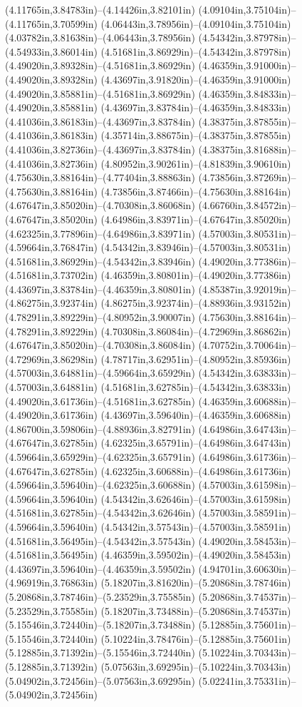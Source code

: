 (4.11765in,3.84783in)--(4.14426in,3.82101in) (4.09104in,3.75104in)--(4.11765in,3.70599in) (4.06443in,3.78956in)--(4.09104in,3.75104in) (4.03782in,3.81638in)--(4.06443in,3.78956in) (4.54342in,3.87978in)--(4.54933in,3.86014in) (4.51681in,3.86929in)--(4.54342in,3.87978in) (4.49020in,3.89328in)--(4.51681in,3.86929in) (4.46359in,3.91000in)--(4.49020in,3.89328in) (4.43697in,3.91820in)--(4.46359in,3.91000in) (4.49020in,3.85881in)--(4.51681in,3.86929in) (4.46359in,3.84833in)--(4.49020in,3.85881in) (4.43697in,3.83784in)--(4.46359in,3.84833in) (4.41036in,3.86183in)--(4.43697in,3.83784in) (4.38375in,3.87855in)--(4.41036in,3.86183in) (4.35714in,3.88675in)--(4.38375in,3.87855in) (4.41036in,3.82736in)--(4.43697in,3.83784in) (4.38375in,3.81688in)--(4.41036in,3.82736in) (4.80952in,3.90261in)--(4.81839in,3.90610in) (4.75630in,3.88164in)--(4.77404in,3.88863in) (4.73856in,3.87269in)--(4.75630in,3.88164in) (4.73856in,3.87466in)--(4.75630in,3.88164in) (4.67647in,3.85020in)--(4.70308in,3.86068in) (4.66760in,3.84572in)--(4.67647in,3.85020in) (4.64986in,3.83971in)--(4.67647in,3.85020in) (4.62325in,3.77896in)--(4.64986in,3.83971in) (4.57003in,3.80531in)--(4.59664in,3.76847in) (4.54342in,3.83946in)--(4.57003in,3.80531in) (4.51681in,3.86929in)--(4.54342in,3.83946in) (4.49020in,3.77386in)--(4.51681in,3.73702in) (4.46359in,3.80801in)--(4.49020in,3.77386in) (4.43697in,3.83784in)--(4.46359in,3.80801in) (4.85387in,3.92019in)--(4.86275in,3.92374in) (4.86275in,3.92374in)--(4.88936in,3.93152in) (4.78291in,3.89229in)--(4.80952in,3.90007in) (4.75630in,3.88164in)--(4.78291in,3.89229in) (4.70308in,3.86084in)--(4.72969in,3.86862in) (4.67647in,3.85020in)--(4.70308in,3.86084in) (4.70752in,3.70064in)--(4.72969in,3.86298in) (4.78717in,3.62951in)--(4.80952in,3.85936in) (4.57003in,3.64881in)--(4.59664in,3.65929in) (4.54342in,3.63833in)--(4.57003in,3.64881in) (4.51681in,3.62785in)--(4.54342in,3.63833in) (4.49020in,3.61736in)--(4.51681in,3.62785in) (4.46359in,3.60688in)--(4.49020in,3.61736in) (4.43697in,3.59640in)--(4.46359in,3.60688in) (4.86700in,3.59806in)--(4.88936in,3.82791in) (4.64986in,3.64743in)--(4.67647in,3.62785in) (4.62325in,3.65791in)--(4.64986in,3.64743in) (4.59664in,3.65929in)--(4.62325in,3.65791in) (4.64986in,3.61736in)--(4.67647in,3.62785in) (4.62325in,3.60688in)--(4.64986in,3.61736in) (4.59664in,3.59640in)--(4.62325in,3.60688in) (4.57003in,3.61598in)--(4.59664in,3.59640in) (4.54342in,3.62646in)--(4.57003in,3.61598in) (4.51681in,3.62785in)--(4.54342in,3.62646in) (4.57003in,3.58591in)--(4.59664in,3.59640in) (4.54342in,3.57543in)--(4.57003in,3.58591in) (4.51681in,3.56495in)--(4.54342in,3.57543in) (4.49020in,3.58453in)--(4.51681in,3.56495in) (4.46359in,3.59502in)--(4.49020in,3.58453in) (4.43697in,3.59640in)--(4.46359in,3.59502in) (4.94701in,3.60630in)--(4.96919in,3.76863in) (5.18207in,3.81620in)--(5.20868in,3.78746in) (5.20868in,3.78746in)--(5.23529in,3.75585in) (5.20868in,3.74537in)--(5.23529in,3.75585in) (5.18207in,3.73488in)--(5.20868in,3.74537in) (5.15546in,3.72440in)--(5.18207in,3.73488in) (5.12885in,3.75601in)--(5.15546in,3.72440in) (5.10224in,3.78476in)--(5.12885in,3.75601in) (5.12885in,3.71392in)--(5.15546in,3.72440in) (5.10224in,3.70343in)--(5.12885in,3.71392in) (5.07563in,3.69295in)--(5.10224in,3.70343in) (5.04902in,3.72456in)--(5.07563in,3.69295in) (5.02241in,3.75331in)--(5.04902in,3.72456in) 